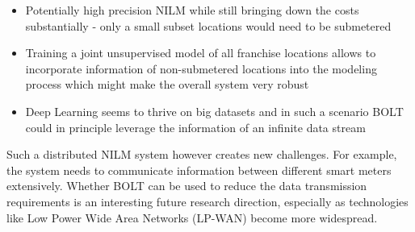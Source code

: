 \begin{description}
\begin{itemize}
\item Potentially high precision NILM while still bringing down the costs substantially - only a small subset locations would need to be submetered
\item Training a joint unsupervised model of all franchise locations allows to incorporate information of non-submetered locations into the modeling process which might make the overall system very robust
\item Deep Learning seems to thrive on big datasets and in such a scenario BOLT could in principle leverage the information of an infinite data stream
\end{itemize}
Such a distributed NILM system however creates new challenges. For example, the system needs to communicate information between different smart meters extensively. Whether BOLT can be used to reduce the data transmission requirements is an interesting future research direction, especially as technologies like Low Power Wide Area Networks (LP-WAN) become more widespread.
\end{description}

